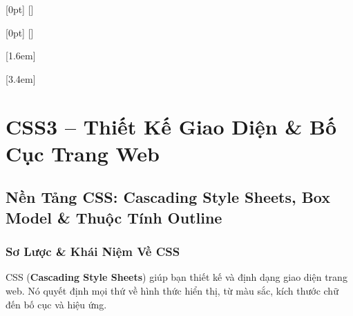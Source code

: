 \documentclass[11pt,oneside]{book}
\newcommand{\term}[1]{\textbf{\textcolor{primaryBlue}{#1}}}
\begin{document}
[0pt]
  {\addvspace{8pt}\sffamily\bfseries\color{primaryBlue}\large}
  {\thecontentslabel\quad}
  {}
  {\hfill\contentspage}
  [\addvspace{3pt}]

[0pt]
  {\addvspace{5pt}\sffamily\bfseries\color{primaryBlue}}
  {\thecontentslabel\quad}
  {}
  {\;\bfseries\contentspage}
  [\addvspace{1pt}]

[1.6em]
  {\sffamily\small\bfseries\color{darkText}}
  {\thecontentslabel\quad}
  {}
  {\;\contentspage}

[3.4em]
  {\sffamily\footnotesize\color{darkText!85}}
  {\thecontentslabel\quad}
  {}
  {\;\contentspage}

\begingroup
\setlength{\parskip}{0pt}
\tableofcontents
\endgroup
\clearpage

\mainmatter

\part{CSS3 -- Thiết Kế Giao Diện \& Bố Cục Trang Web}

\chapter{Nền Tảng CSS: Cascading Style Sheets, Box Model \& Thuộc Tính Outline}
\label{chap:css_foundations}

\section{Sơ Lược \& Khái Niệm Về CSS}

CSS (\term{Cascading Style Sheets}) giúp bạn thiết kế và định dạng giao diện trang web. Nó quyết định mọi thứ về hình thức hiển thị, từ màu sắc, kích thước chữ đến bố cục và hiệu ứng.
\end{document}
